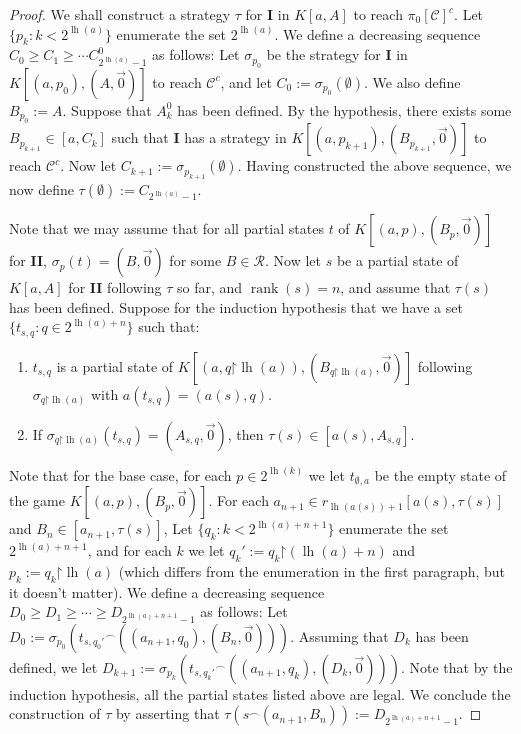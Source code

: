 \documentclass[11pt,reqno]{amsart}
\theoremstyle{plain}
\numberwithin{equation}{section}
\theoremstyle{definition}
\newcommand{\func}{\operatorname}
\newcommand{\cal}{\mathcal}
\newcommand{\rank}{\func{rank}}
\newcommand{\restrictedto}{\mathord{\upharpoonright}}
\newcommand{\lh}{\func{lh}}
\begin{document}
\begin{proof}
    We shall construct a strategy $\tau$ for \textbf{I} in $K[a,A]$ to reach $\pi_0[\cal{C}]^c$. Let $\{p_k : k < 2^{\lh(a)}\}$ enumerate the set $2^{\lh(a)}$. We define a decreasing sequence $C_0 \geq C_1 \geq \cdots C_{2^{\lh(a)}-1}^0$ as follows: Let $\sigma_{p_0}$ be the strategy for \textbf{I} in $K[(a,p_0),(A,\vec{0})]$ to reach $\cal{C}^c$, and let $C_0 := \sigma_{p_0}(\emptyset)$. We also define $B_{p_0} := A$. Suppose that $A_k^0$ has been defined. By the hypothesis, there exists some $B_{p_{k+1}} \in [a,C_k]$ such that \textbf{I} has a strategy in $K[(a,p_{k+1}),(B_{p_{k+1}},\vec{0})]$ to reach $\cal{C}^c$. Now let $C_{k+1} := \sigma_{p_{k+1}}(\emptyset)$. Having constructed the above sequence, we now define $\tau(\emptyset) := C_{2^{\lh(a)}-1}$. 

    Note that we may assume that for all partial states $t$ of $K[(a,p),(B_p,\vec{0})]$ for \textbf{II}, $\sigma_p(t) = (B,\vec{0})$ for some $B \in \cal{R}$. Now let $s$ be a partial state of $K[a,A]$ for \textbf{II} following $\tau$ so far, and $\rank(s) = n$, and assume that $\tau(s)$ has been defined. Suppose for the induction hypothesis that we have a set $\{t_{s,q} : q \in 2^{\lh(a)+n}\}$ such that:
    \begin{enumerate}
        \item $t_{s,q}$ is a partial state of $K[(a,q\restrictedto\lh(a)),(B_{q\restrictedto\lh(a)},\vec{0})]$ following $\sigma_{q\restrictedto\lh(a)}$ with $a(t_{s,q}) = (a(s),q)$.

        \item If $\sigma_{q\restrictedto\lh(a)}(t_{s,q}) = (A_{s,q},\vec{0})$, then $\tau(s) \in [a(s),A_{s,q}]$. 
    \end{enumerate}
    Note that for the base case, for each $p \in 2^{\lh(k)}$ we let $t_{\emptyset,a}$ be the empty state of the game $K[(a,p),(B_p,\vec{0})]$. For each $a_{n+1} \in r_{\lh(a(s))+1}[a(s),\tau(s)]$ and $B_n \in [a_{n+1},\tau(s)]$, Let $\{q_k : k < 2^{\lh(a)+n+1}\}$ enumerate the set $2^{\lh(a)+n+1}$, and for each $k$ we let $q_k' := q_k\restrictedto(\lh(a)+n)$ and $p_k := q_k\restrictedto\lh(a)$ (which differs from the enumeration in the first paragraph, but it doesn't matter). We define a decreasing sequence $D_0 \geq D_1 \geq \cdots \geq D_{2^{\lh(a)+n+1}-1}$ as follows: Let $D_0 := \sigma_{p_0}({t_{s,q_0'}}^\frown((a_{n+1},q_0),(B_n,\vec{0})))$. Assuming that $D_k$ has been defined, we let $D_{k+1} := \sigma_{p_k}({t_{s,q_k'}}^\frown((a_{n+1},q_k),(D_k,\vec{0})))$. Note that by the induction hypothesis, all the partial states listed above are legal. We conclude the construction of $\tau$ by asserting that $\tau(s^\frown(a_{n+1},B_n)) := D_{2^{\lh(a)+n+1}-1}$.


\end{proof}
\end{document}
